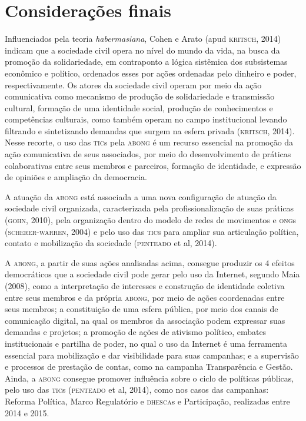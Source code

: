 \section{Considerações finais}

Influenciados pela teoria \textit{habermasiana}, Cohen e Arato (apud \textsc{kritsch},
2014) indicam que a sociedade civil opera no nível do mundo da vida, na
busca da promoção da solidariedade, em contraponto a lógica sistêmica
dos subsistemas econômico e político, ordenados esses por ações
ordenadas pelo dinheiro e poder, respectivamente. Os atores da sociedade
civil operam por meio da ação comunicativa como mecanismo de produção de
solidariedade e transmissão cultural, formação de uma identidade social,
produção de conhecimentos e competências culturais, como também operam
no campo institucional levando filtrando e sintetizando demandas que
surgem na esfera privada (\textsc{kritsch}, 2014). Nesse recorte, o uso das \textsc{tic}s
pela \textsc{abong} é um recurso essencial na promoção da ação comunicativa de
seus associados, por meio do desenvolvimento de práticas colaborativas
entre seus membros e parceiros, formação de identidade, e expressão de
opiniões e ampliação da democracia.

A atuação da \textsc{abong} está associada a uma nova configuração de atuação da
sociedade civil organizada, caracterizada pela profissionalização de
suas práticas (\textsc{gohn}, 2010), pela organização dentro do modelo de
redes de movimentos e \textsc{ong}s (\textsc{scherer}-\textsc{warren}, 2004) e pelo uso das
\textsc{tic}s para ampliar sua articulação política, contato e mobilização da
sociedade (\textsc{penteado} et al, 2014).

A \textsc{abong}, a partir de suas ações analisadas acima, consegue produzir os 4
efeitos democráticos que a sociedade civil pode gerar pelo uso da
Internet, segundo Maia (2008), como a interpretação de interesses e
construção de identidade coletiva entre seus membros e da própria \textsc{abong},
por meio de ações coordenadas entre seus membros; a constituição de uma esfera pública, por meio dos canais de
comunicação digital, na qual os membros da associação podem expressar
suas demandas e projetos; a promoção de ações de ativismo político,
embates institucionais e partilha de poder, no qual o uso da Internet é
uma ferramenta essencial para mobilização e dar visibilidade para suas
campanhas; e a supervisão e processos de prestação de contas, como na
campanha Transparência e Gestão. Ainda, a \textsc{abong} consegue promover
influência sobre o ciclo de políticas públicas, pelo uso das \textsc{tic}s
(\textsc{penteado} et al, 2014), como nos casos das campanhas: Reforma Política,
Marco Regulatório e \textsc{dhesca}s e Participação, realizadas entre 2014 e
2015.

